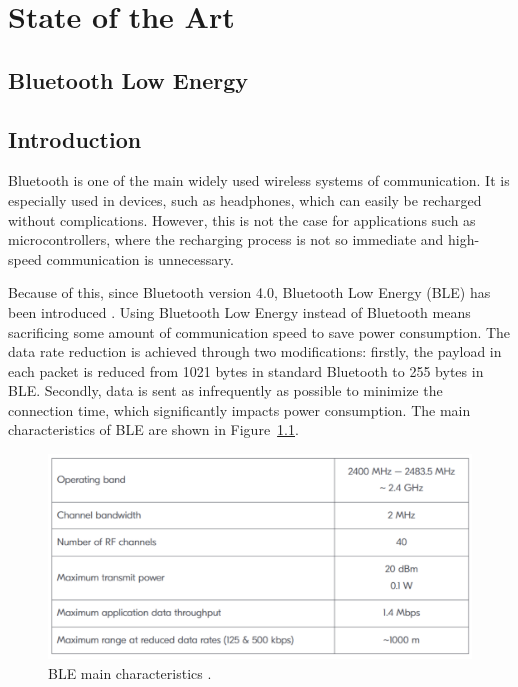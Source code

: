 \documentclass{Configuration_Files/PoliMi3i_thesis}
\begin{document}
\chapter{State of the Art}

\section{Bluetooth Low Energy}

\section{Introduction}
Bluetooth is one of the main widely used wireless systems of communication. It is especially used in devices, such as headphones, which can easily be recharged without complications. However, this is not the case for applications such as microcontrollers, where the recharging process is not so immediate and high-speed communication is unnecessary. 

Because of this, since Bluetooth version 4.0, Bluetooth Low Energy (BLE) has been introduced \cite{nordic1}. Using Bluetooth Low Energy instead of Bluetooth means sacrificing some amount of communication speed to save power consumption. The data rate reduction is achieved through two modifications: firstly, the payload in each packet is reduced from 1021 bytes in standard Bluetooth to 255 bytes in BLE. Secondly, data is sent as infrequently as possible to minimize the connection time, which significantly impacts power consumption. The main characteristics of BLE are shown in Figure~\ref{fig:ble_char}.

\begin{figure}[h]
    \centering
    \includegraphics[width=\linewidth]{Bluetooth Low Energy/Screenshot 2024-08-15 at 23.25.43.png}
    \caption{BLE main characteristics \cite{nordic1}.}
    \label{fig:ble_char}
\end{figure}
\end{document}
